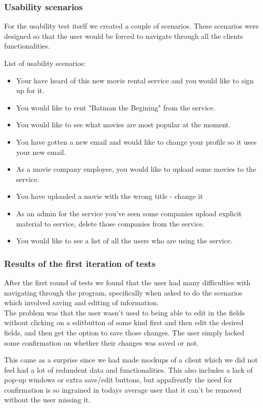 \subsubsection{Usability scenarios}
\label{Design_GUI_Usability_scenarios}
For the usability test itself we created a couple of scenarios. These scenarios were designed so that the user would be forced to navigate through all the clients functionalities.

List of usability scenarios:
\begin{itemize}
\item Your have heard of this new movie rental service and you would like to sign up for it.
\item You would like to rent "Batman the Begining" from the service.
\item You would like to see what movies are most popular at the moment.
\item You have gotten a new email and would like to change your profile so it uses your new email.
\item As a movie company employee, you would like to upload some movies to the service.
\item You have uploaded a movie with the wrong title - change it
\item As an admin for the service you've seen some companies upload explicit material to service, delete those companies from the service.
\item You would like to see a list of all the users who are using the service.
\end {itemize}

\subsubsection[First Iteration]{Results of the first iteration of tests}
\label{Design_GUI_Usability_FirstIteration}
After the first round of tests we found that the user had many difficulties with navigating through the program, specifically when asked to do 
the scenarios which involved saving and editing of information.\\ 
The problem was that the user wasn't used to being able to edit in the fields without
clicking on a editbutton of some kind first and then edit the desired fields, and then get the option to save those changes.
The user simply lacked some confirmation on whether their changes was saved or not.

This came as a surprise since we had made mockups of a client which we did not feel had a lot of redundent data and functionalities. This also includes a lack of pop-up windows or extra save/edit buttons, but appafrently the need for confirmation is so ingrained in todays average user that it can't be removed without the user missing it.

